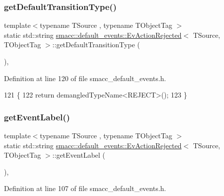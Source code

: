 \subsubsection{\texorpdfstring{get\+Default\+Transition\+Type()}{getDefaultTransitionType()}}
{\footnotesize\ttfamily template$<$typename T\+Source , typename T\+Object\+Tag $>$ \\
static std\+::string \hyperlink{structsmacc_1_1default__events_1_1EvActionRejected}{smacc\+::default\+\_\+events\+::\+Ev\+Action\+Rejected}$<$ T\+Source, T\+Object\+Tag $>$\+::get\+Default\+Transition\+Type (\begin{DoxyParamCaption}{ }\end{DoxyParamCaption})\hspace{0.3cm}{\ttfamily [inline]}, {\ttfamily [static]}}



Definition at line 120 of file smacc\+\_\+default\+\_\+events.\+h.


\begin{DoxyCode}
121   \{
122     \textcolor{keywordflow}{return} demangledTypeName<REJECT>();
123   \}
\end{DoxyCode}
\mbox{\label{structsmacc_1_1default__events_1_1EvActionRejected_ad86fe8ccabe089f94cfaffdde3dadd0b}} 
\subsubsection{\texorpdfstring{get\+Event\+Label()}{getEventLabel()}}
{\footnotesize\ttfamily template$<$typename T\+Source , typename T\+Object\+Tag $>$ \\
static std\+::string \hyperlink{structsmacc_1_1default__events_1_1EvActionRejected}{smacc\+::default\+\_\+events\+::\+Ev\+Action\+Rejected}$<$ T\+Source, T\+Object\+Tag $>$\+::get\+Event\+Label (\begin{DoxyParamCaption}{ }\end{DoxyParamCaption})\hspace{0.3cm}{\ttfamily [inline]}, {\ttfamily [static]}}



Definition at line 107 of file smacc\+\_\+default\+\_\+events.\+h.


